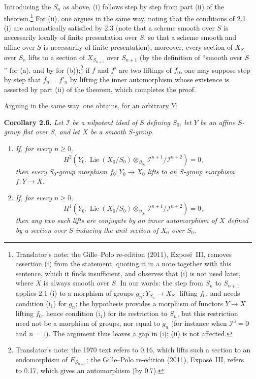 Introducing the \(S_n\) as above, (i) follows step by step from part (ii) of
the theorem.\footnote{Translator's note: the Gille--Polo re-edition (2011), Exposé~III, removes assertion (i) from the statement,
quoting it in a note together with this sentence, which it finds insufficient,
and observes that (i) is not used later, where \(X\) is always smooth over \(S\).
In our words: the step from \(S_n\) to \(S_{n+1}\) applies 2.1 (i) to a
morphism of groups \(g_n\colon Y_{S_n}\to X_{S_n}\) lifting \(f_0\), and needs
condition (i\(_1\)) for \(g_n\); the hypothesis provides a morphism of
functors \(Y\to X\) lifting \(f_0\), hence condition (i\(_1\)) for its
restriction to \(S_n\), but this restriction need not be a morphism of
groups, nor equal to \(g_n\) (for instance when \(\mathscr I^3=0\) and
\(n=1\)). The argument thus leaves a gap in (i); (ii) is not affected.} For
(ii), one argues in the same way, noting that the conditions of 2.1 (i) are
automatically satisfied by 2.3 (note that a scheme smooth over \(S\) is
necessarily locally of finite presentation over \(S\), so that a scheme smooth
and affine over \(S\) is necessarily of finite presentation); moreover, every
section of \(X_{S_n}\) over \(S_n\) lifts to a section of \(X_{S_{n+1}}\) over
\(S_{n+1}\) (by the definition of ``smooth over \(S\)'' for (a), and by
 for (b));\footnote{Translator's note: the 1970 text refers to 0.16,
which lifts such a section to an endomorphism of \(E_{S_{n+1}}\); the
Gille--Polo re-edition (2011), Exposé~III, refers to 0.17, which gives an
automorphism (by 0.7).} if \(f\) and \(f'\) are two liftings of \(f_0\), one
may suppose step by step that \(f_n=f'_n\) by lifting the inner automorphism
whose existence is asserted by part (ii) of the theorem, which completes the
proof.

Arguing in the same way, one obtains, for an arbitrary \(Y\):

\medskip
\noindent{}\textbf{Corollary 2.6.}
\textit{Let \(\mathscr I\) be a nilpotent ideal of \(S\) defining
\(S_0\), let \(Y\) be an affine \(S\)-group flat over \(S\), and let
\(X\) be a smooth \(S\)-group.}
\begin{enumerate}
\item[\(i\)] \textit{If, for every \(n\geq0\),}
 \[
  H^2\!\left(Y_0,
   \operatorname{Lie}(X_0/S_0)\otimes_{\mathscr O_{S_0}}
   \mathscr I^{n+1}/\mathscr I^{n+2}\right)=0,
 \]
 \textit{then every \(S_0\)-group morphism \(f_0:Y_0\to X_0\) lifts
 to an \(S\)-group morphism \(f:Y\to X\).}
\item[(ii)] \textit{If, for every \(n\geq0\),}
 \[
  H^1\!\left(Y_0,
   \operatorname{Lie}(X_0/S_0)\otimes_{\mathscr O_{S_0}}
   \mathscr I^{n+1}/\mathscr I^{n+2}\right)=0,
 \]
 \textit{then any two such lifts are conjugate by an inner
 automorphism of \(X\) defined by a section over \(S\) inducing the
 unit section of \(X_0\) over \(S_0\).}
\end{enumerate}

